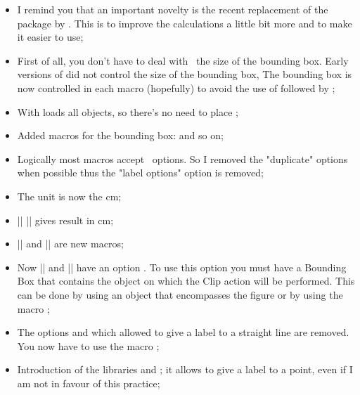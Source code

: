 \vspace{1cm}
 \begin{itemize}\setlength{\itemsep}{10pt} 

\item I remind you that an important  novelty is the recent replacement of the  package by .  This is to improve the calculations a little bit more and to make it easier to use;


\item First of all, you don’t have to deal with \TIKZ\ the size of the bounding box. Early versions of \tkzname{\tkznameofpack} did not control the size of the bounding box, The bounding box is now controlled in each macro (hopefully) to avoid the use of  followed by ;

\item  With  loads all objects, so there's no need to place ;

\item Added macros for the bounding box:   and so on;

\item  Logically most macros accept \TIKZ\ options. So I removed the "duplicate" options when possible thus the "label options" option is removed;

\item The unit is now the cm;

\item |\tkzCalcLength| |\tkzGetLength| gives result in cm;

\item  |\tkzMarkArc| and |\tkzLabelArc| are new macros;

\item Now |\tkzClipCircle| and |\tkzClipPolygon| have an option . To use this option you must have a Bounding Box that contains the object on which the Clip action will be performed. This can be done by using an object that encompasses the figure or by using the macro ;


\item The options  and  which allowed to give a label to a straight  line are removed. You now have to use the macro ;

\item Introduction of the libraries  and ; it allows to give a label to a point, even if I am not in favour of this practice;


\end{itemize}
